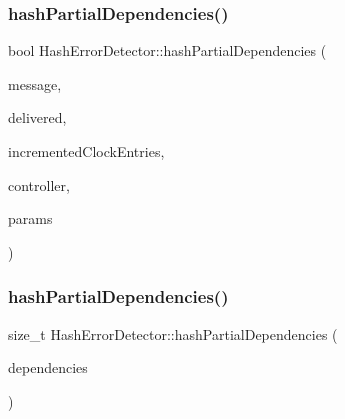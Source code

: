 \subsubsection{\texorpdfstring{hash\+Partial\+Dependencies()}{hashPartialDependencies()}\hspace{0.1cm}{\footnotesize\ttfamily [1/2]}}
{\footnotesize\ttfamily bool Hash\+Error\+Detector\+::hash\+Partial\+Dependencies (\begin{DoxyParamCaption}\item[{const \hyperlink{structures_8h_a7e7bdc1d2fff8a9436f2f352b2711ed6}{message\+Info} \&}]{message,  }\item[{const vector$<$ \hyperlink{structures_8h_a7e7bdc1d2fff8a9436f2f352b2711ed6}{message\+Info} $>$ \&}]{delivered,  }\item[{const vector$<$ unsigned int $>$ \&}]{incremented\+Clock\+Entries,  }\item[{\hyperlink{class_controller}{Controller} $\ast$}]{controller,  }\item[{\hyperlink{class_simulation_parameters}{Simulation\+Parameters} $\ast$}]{params }\end{DoxyParamCaption})}

\mbox{\label{class_hash_error_detector_aed8b0c6d17198a493e5b89f69c2e8713}} 
\subsubsection{\texorpdfstring{hash\+Partial\+Dependencies()}{hashPartialDependencies()}\hspace{0.1cm}{\footnotesize\ttfamily [2/2]}}
{\footnotesize\ttfamily size\+\_\+t Hash\+Error\+Detector\+::hash\+Partial\+Dependencies (\begin{DoxyParamCaption}\item[{const \hyperlink{class_partial_dependencies}{Partial\+Dependencies} \&}]{dependencies }\end{DoxyParamCaption})}

\mbox{\label{class_hash_error_detector_a13dd5fae3ca4898bd91d1801beed24a4}} 
